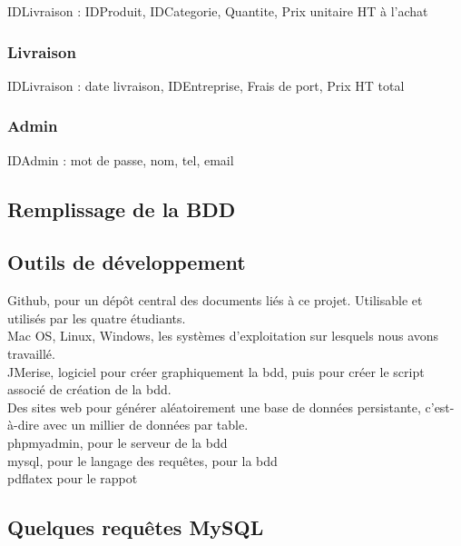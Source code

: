 \documentclass[a4paper, 12pt]{report}
\begin{document}
\begin{spacing}{1.2}
IDLivraison : IDProduit, IDCategorie, Quantite, Prix unitaire HT à l'achat

\textcolor{colortitre3}{\subsubsection*{\hypertarget{Livraison}{Livraison}}}

IDLivraison : date livraison, IDEntreprise, Frais de port, Prix HT total


\textcolor{colortitre3}{\subsubsection*{\hypertarget{Admin}{Admin}}}

IDAdmin : mot de passe, nom, tel, email



\textcolor{colortitre2}{\subsection*{Remplissage de la BDD}} 





\textcolor{colortitre2}{\subsection*{Outils de développement}} 

Github, pour un dépôt central des documents liés à ce projet. Utilisable et utilisés par les quatre étudiants. \\
Mac OS, Linux, Windows, les systèmes d'exploitation sur lesquels nous avons travaillé. \\
JMerise, logiciel pour créer graphiquement la bdd, puis pour créer le script associé de création de la bdd. \\
Des sites web pour générer aléatoirement une base de données persistante, c'est-à-dire avec un millier de données par table. \\
phpmyadmin, pour le serveur de la bdd \\
mysql, pour le langage des requêtes, pour la bdd \\
pdflatex pour le rappot \\



\textcolor{colortitre2}{\subsection*{Quelques requêtes MySQL}} 




\end{spacing}
\end{document}
